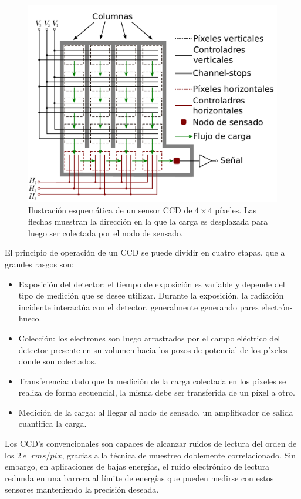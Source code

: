 \begin{figure}[h]
    \centering
        \includegraphics[scale=.5]{Figs/ArquitecturaCCD.pdf}
    \caption{Ilustración esquemática de un sensor CCD de $4\times4$ píxeles. Las flechas muestran la dirección en la que la carga es desplazada para luego ser colectada por el nodo de sensado.}
    \label{fig:ArgquitecturaCCDn}
\end{figure}
El principio de operación de un CCD se puede dividir en cuatro etapas, que a grandes rasgos son:
\begin{itemize}
    \item Exposición del detector: el tiempo de exposición es variable y depende del tipo de medición que se desee utilizar. Durante la exposición, la radiación incidente interactúa con el detector, generalmente generando pares electrón-hueco. 
    \item Colección: los electrones son luego arrastrados por el campo eléctrico del detector presente en su volumen hacia los pozos de potencial de los píxeles donde son colectados.
    \item Transferencia: dado que la medición de la carga colectada en los píxeles se realiza de forma secuencial, la misma debe ser transferida de un píxel a otro.
    \item Medición de la carga: al llegar al nodo de sensado, un amplificador de salida cuantifica la carga.
\end{itemize}
Los CCD's convencionales son capaces de alcanzar ruidos de lectura del orden de los $2\,e^{-}\si{rms/pix}$, gracias a la técnica de muestreo doblemente correlacionado\cite{Tiffenberg}. Sin embargo, en aplicaciones de bajas energías, el ruido electrónico de lectura redunda en una barrera al límite de energías que pueden medirse con estos sensores manteniendo la precisión deseada. 

